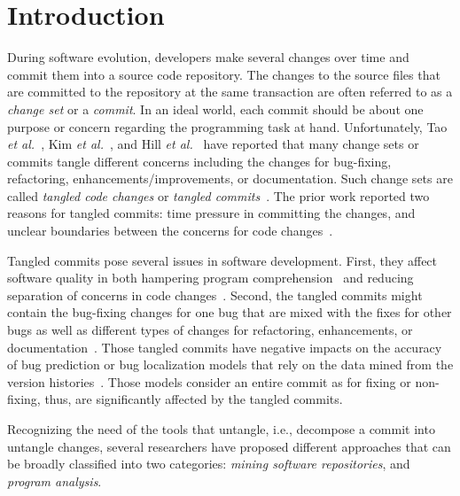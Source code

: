 \section{Introduction}
\label{intro:sec}

During software evolution, developers make several changes over time
and commit them into a source code repository. The changes to the
source files that are committed to the repository at the same
transaction are often referred to as a {\em change set} or a {\em
  commit}. In an ideal world, each commit should be about one purpose
or concern regarding the programming task at hand.  Unfortunately, Tao
{\em et al.}~\cite{tao-fse12}, Kim {\em et
  al.}~\cite{kim-emse16,kim-msr13}, and Hill {\em et
  al.}~\cite{hill-tse12} have reported that many change sets or
commits tangle different concerns including the changes for
bug-fixing, refactoring, enhancements/improvements, or
documentation. Such change sets are called {\em tangled code changes}
or {\em tangled commits}~\cite{kim-emse16,kim-msr13}. The prior work
reported two reasons for tangled commits: time pressure in committing
the changes, and unclear boundaries between the concerns for code
changes~\cite{flexeme-fse20}.

Tangled commits pose several issues in software development. First,
they affect software quality in both hampering program
comprehension~\cite{tao-fse12} and reducing separation of concerns in
code changes~\cite{flexeme-fse20}. Second, the tangled commits
might contain the bug-fixing changes for one bug that are mixed with
the fixes for other bugs as well as different types of changes for
refactoring, enhancements, or
documentation~\cite{kim-emse16,kim-msr13,nguyen-issre13}. Those
tangled commits have negative impacts on the accuracy of bug
prediction or bug localization models that rely on the data mined from
the version histories~\cite{kim-emse16,kim-msr13}. Those models 
consider an entire commit as for fixing or non-fixing, thus,
are significantly affected by the tangled commits.

Recognizing the need of the tools that untangle, i.e., decompose a
commit into untangle changes, several researchers have proposed
different approaches that can be broadly classified into two
categories: {\em mining software repositories}, and {\em program
  analysis}.

